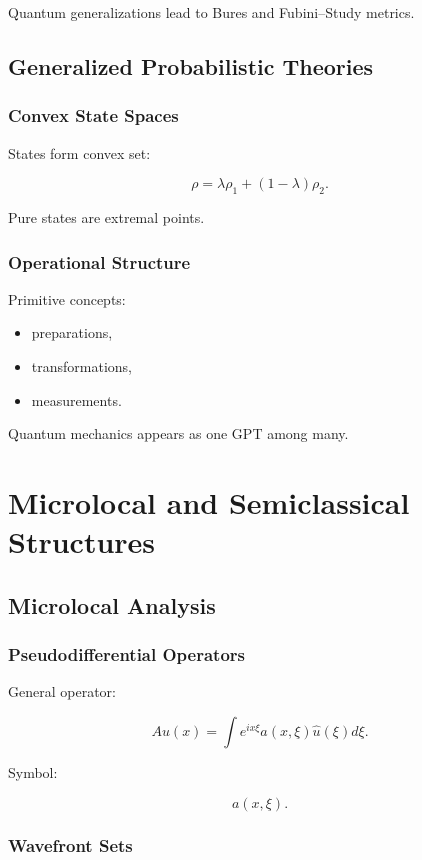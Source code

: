 \documentclass[11pt]{book}
\begin{document}
Quantum generalizations lead to Bures and Fubini--Study metrics.

\chapter{Generalized Probabilistic Theories}

\section{Convex State Spaces}

States form convex set:

\[
\rho
=
\lambda\rho_1+(1-\lambda)\rho_2.
\]

Pure states are extremal points.

\section{Operational Structure}

Primitive concepts:

\begin{itemize}
\item preparations,
\item transformations,
\item measurements.
\end{itemize}

Quantum mechanics appears as one GPT among many.

\part{Microlocal and Semiclassical Structures}

\chapter{Microlocal Analysis}

\section{Pseudodifferential Operators}

General operator:

\[
Au(x)
=
\int
 e^{ix\xi}
a(x,\xi)\hat u(\xi)d\xi.
\]

Symbol:

\[
a(x,\xi).
\]

\section{Wavefront Sets}
\end{document}
